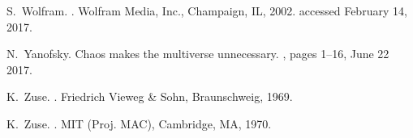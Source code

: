 \documentclass[12pt]{article}
\begin{document}
\begin{thebibliography}{10}
S.~Wolfram.
.
\newblock Wolfram Media, Inc., Champaign, IL, 2002.
\newblock accessed February 14, 2017.

N.~Yanofsky.
\newblock Chaos makes the multiverse unnecessary.
, pages 1--16, June 22 2017.

K.~Zuse.
.
\newblock Friedrich Vieweg \& Sohn, Braunschweig, 1969.

K.~Zuse.
.
\newblock MIT (Proj. MAC), Cambridge, MA, 1970.

\end{thebibliography}
\end{document}
